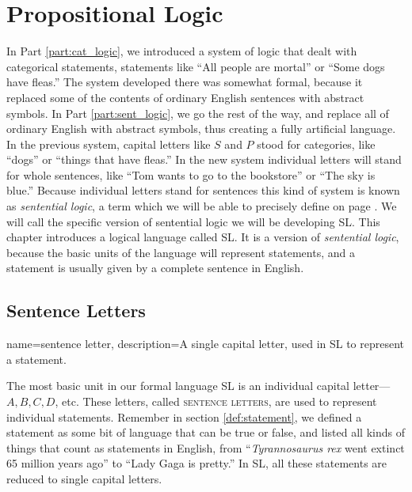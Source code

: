 \chapter{Propositional Logic}
\label{chap:SL}


{In Part \ref{part:cat_logic}, we introduced a system of logic that dealt with categorical statements, statements like ``All people are mortal'' or ``Some dogs have  fleas.'' The system developed there was somewhat formal, because it replaced some of the contents of ordinary English sentences with abstract symbols. In Part \ref{part:sent_logic}, we go the rest of the way, and replace all of ordinary English with abstract symbols, thus creating a fully artificial language. In the previous system, capital letters like $S$ and $P$ stood for categories, like ``dogs'' or ``things that have fleas.'' In the new system individual letters will stand for whole sentences, like ``Tom wants to go to the bookstore'' or ``The sky is blue.'' Because individual letters stand for sentences this kind of system is known as \textit{sentential logic}, a term which we will be able to precisely define on page \pageref{def:sentential_logic}. We will call the specific version of sentential logic we will be developing SL.}%
{This chapter introduces a logical language called SL. It is a version of \emph{sentential logic}, because the basic units of the language will represent statements, and a statement is usually given by a complete sentence in English.} %








\section{Sentence Letters}


{
name=sentence letter,
description={A single capital letter, used in SL to represent a statement.}
}

The most basic unit in our formal language SL is an individual capital letter---$A, B, C, D$, etc. These letters, called \textsc{\glspl{sentence letter}}, \label{def:sentence_letter} are used to represent individual statements. Remember in section \ref{def:statement}, we defined a statement as some bit of language that can be true or false, and listed all kinds of things that count as statements in English, from ``\emph{Tyrannosaurus rex} went extinct 65 million years ago'' to ``Lady Gaga is pretty.'' In SL, all these statements are reduced to single capital letters.

